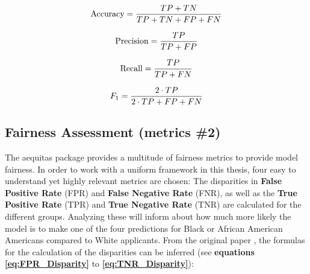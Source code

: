 \begin{equation}
    \text{Accuracy} = \frac{TP + TN}{TP + TN + FP + FN}
    \label{eq:Accuracy}
    \addcontentsline{frm}{formulas}{\protect\numberline{\theequation}\hspace{1em}Accuracy}
\end{equation}

\begin{equation}
    \text{Precision} = \frac{TP}{TP + FP}
    \label{eq:Precision}
    \addcontentsline{frm}{formulas}{\protect\numberline{\theequation}\hspace{1em}Precision}
\end{equation}

\begin{equation}
    \text{Recall} = \frac{TP}{TP + FN}
    \label{eq:Recall}
    \addcontentsline{frm}{formulas}{\protect\numberline{\theequation}\hspace{1em}Recall}
\end{equation}

\begin{equation}
    F_1 = \frac{2 \cdot TP}{2 \cdot TP + FP + FN}
    \label{eq:F1}
    \addcontentsline{frm}{formulas}{\protect\numberline{\theequation}\hspace{1em}F1 Score}
\end{equation}


\subsection{Fairness Assessment (metrics \#2)}\label{subsec:Fairness_Assessment}


The aequitas package provides a multitude of fairness metrics to provide model fairness. In order to work with a uniform framework in this thesis, four easy to understand yet highly relevant metrics are chosen: 
The disparities in \textbf{False Positive Rate} (FPR) and \textbf{False Negative Rate} (FNR), as well as the \textbf{True Positive Rate} (TPR) and \textbf{True Negative Rate} (TNR) are calculated for the different groups.
Analyzing these will inform about how much more likely the model is to make one of the four predictions for Black or African American Americans compared to White applicants.
From the original paper \parencite{2018aequitas}, the formulas for the calculation of the disparities can be inferred (see \textbf{equations \ref{eq:FPR_Disparity}} to \textbf{\ref{eq:TNR_Disparity}}):

